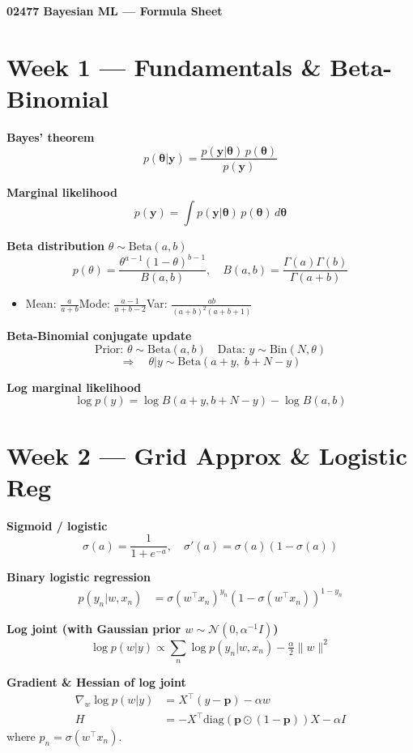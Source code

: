 \documentclass[9pt,a4paper]{extarticle}
\newcommand{\N}{\mathcal{N}}
\newcommand{\diag}{\mathrm{diag}}
\renewcommand{\vec}[1]{\bm{#1}}
\begin{document}
{\centering\bfseries\normalsize 02477 Bayesian ML — Formula Sheet\par}
\vspace{4pt}

\section{Week 1 — Fundamentals \& Beta-Binomial}

\textbf{Bayes' theorem}
\[
p(\vec{\theta}|\vec{y}) = \frac{p(\vec{y}|\vec{\theta})\,p(\vec{\theta})}{p(\vec{y})}
\]

\textbf{Marginal likelihood}
\[
p(\vec{y}) = \int p(\vec{y}|\vec{\theta})\,p(\vec{\theta})\,d\vec{\theta}
\]

\textbf{Beta distribution} $\theta \sim \mathrm{Beta}(a,b)$
\[
p(\theta) = \frac{\theta^{a-1}(1-\theta)^{b-1}}{B(a,b)},\quad B(a,b)=\frac{\Gamma(a)\Gamma(b)}{\Gamma(a+b)}
\]
\begin{itemize}[noitemsep,topsep=0pt,leftmargin=*]
  \item Mean: $\frac{a}{a+b}$\quad Mode: $\frac{a-1}{a+b-2}$\quad Var: $\frac{ab}{(a+b)^2(a+b+1)}$
\end{itemize}

\textbf{Beta-Binomial conjugate update}
\[
\text{Prior: }\theta\sim\mathrm{Beta}(a,b)\quad
\text{Data: }y\sim\mathrm{Bin}(N,\theta)
\]
\[
\Rightarrow\quad \theta|y \sim \mathrm{Beta}(a+y,\; b+N-y)
\]

\textbf{Log marginal likelihood}
\[
\log p(y) = \log B(a+y,b+N-y) - \log B(a,b)
\]

\section{Week 2 — Grid Approx \& Logistic Reg}

\textbf{Sigmoid / logistic}
\[
\sigma(a) = \frac{1}{1+e^{-a}},\quad \sigma'(a)=\sigma(a)(1-\sigma(a))
\]

\textbf{Binary logistic regression}
\begin{align*}
p(y_n|w,x_n) &= \sigma(w^\top x_n)^{y_n}(1-\sigma(w^\top x_n))^{1-y_n}
\end{align*}

\textbf{Log joint (with Gaussian prior $w\sim\N(0,\alpha^{-1}I)$)}
\[
\log p(w|y) \propto \sum_n \log p(y_n|w,x_n) - \tfrac{\alpha}{2}\|w\|^2
\]

\textbf{Gradient \& Hessian of log joint}
\begin{align*}
\nabla_w\log p(w|y) &= X^\top(y-\vec{p}) - \alpha w \\
H &= -X^\top\diag(\vec{p}\odot(1-\vec{p}))X - \alpha I
\end{align*}
where $p_n = \sigma(w^\top x_n)$.
\end{document}
